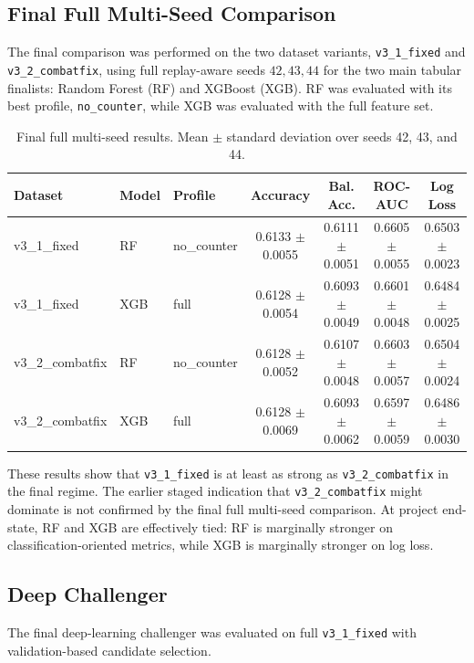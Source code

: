 
\subsection{Final Full Multi-Seed Comparison}
The final comparison was performed on the two dataset variants, \texttt{v3\_1\_fixed} and \texttt{v3\_2\_combatfix}, using full replay-aware seeds $42,43,44$ for the two main tabular finalists: Random Forest (RF) and XGBoost (XGB). RF was evaluated with its best profile, \texttt{no\_counter}, while XGB was evaluated with the full feature set.

\begin{table}[h]
\centering
\caption{Final full multi-seed results. Mean $\pm$ standard deviation over seeds 42, 43, and 44.}
\begin{tabular}{l l l c c c c}
\hline
Dataset & Model & Profile & Accuracy & Bal. Acc. & ROC-AUC & Log Loss \\
\hline
v3\_1\_fixed & RF  & no\_counter & 0.6133 $\pm$ 0.0055 & 0.6111 $\pm$ 0.0051 & 0.6605 $\pm$ 0.0055 & 0.6503 $\pm$ 0.0023 \\
v3\_1\_fixed & XGB & full        & 0.6128 $\pm$ 0.0054 & 0.6093 $\pm$ 0.0049 & 0.6601 $\pm$ 0.0048 & 0.6484 $\pm$ 0.0025 \\
v3\_2\_combatfix & RF  & no\_counter & 0.6128 $\pm$ 0.0052 & 0.6107 $\pm$ 0.0048 & 0.6603 $\pm$ 0.0057 & 0.6504 $\pm$ 0.0024 \\
v3\_2\_combatfix & XGB & full        & 0.6128 $\pm$ 0.0069 & 0.6093 $\pm$ 0.0062 & 0.6597 $\pm$ 0.0059 & 0.6486 $\pm$ 0.0030 \\
\hline
\end{tabular}
\end{table}

These results show that \texttt{v3\_1\_fixed} is at least as strong as \texttt{v3\_2\_combatfix} in the final regime. The earlier staged indication that \texttt{v3\_2\_combatfix} might dominate is not confirmed by the final full multi-seed comparison. At project end-state, RF and XGB are effectively tied: RF is marginally stronger on classification-oriented metrics, while XGB is marginally stronger on log loss.

\subsection{Deep Challenger}
The final deep-learning challenger was evaluated on full \texttt{v3\_1\_fixed} with validation-based candidate selection.


